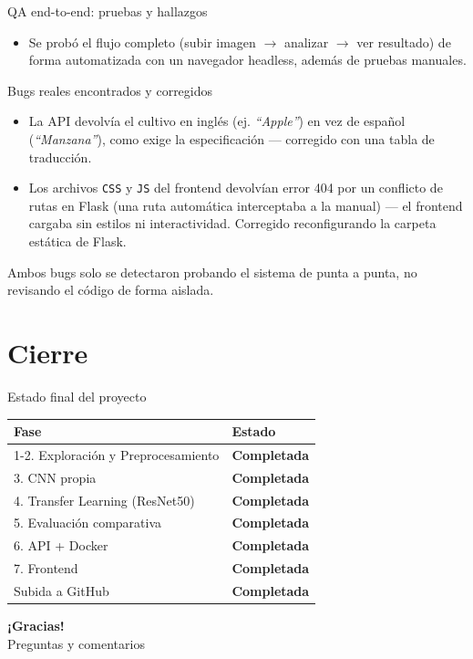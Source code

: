 \documentclass[aspectratio=169]{beamer}
\begin{document}
\begin{frame}{QA end-to-end: pruebas y hallazgos}
  \begin{itemize}
    \item Se probó el flujo completo (subir imagen $\to$ analizar $\to$ ver resultado) de forma automatizada con un navegador headless, además de pruebas manuales.
  \end{itemize}
  \begin{alertblock}{Bugs reales encontrados y corregidos}
    \begin{itemize}
      \item La API devolvía el cultivo en inglés (ej. \textit{``Apple''}) en vez de español (\textit{``Manzana''}), como exige la especificación — corregido con una tabla de traducción.
      \item Los archivos \texttt{CSS} y \texttt{JS} del frontend devolvían error 404 por un conflicto de rutas en Flask (una ruta automática interceptaba a la manual) — el frontend cargaba sin estilos ni interactividad. Corregido reconfigurando la carpeta estática de Flask.
    \end{itemize}
  \end{alertblock}
  \footnotesize Ambos bugs solo se detectaron probando el sistema de punta a punta, no revisando el código de forma aislada.
\end{frame}

\section{Cierre}

\begin{frame}{Estado final del proyecto}
  \centering
  \begin{tabular}{p{6cm}p{3.5cm}}
    \toprule
    \textbf{Fase} & \textbf{Estado} \\
    \midrule
    1-2. Exploración y Preprocesamiento & \textcolor{okgreen}{\textbf{Completada}} \\
    3. CNN propia & \textcolor{okgreen}{\textbf{Completada}} \\
    4. Transfer Learning (ResNet50) & \textcolor{okgreen}{\textbf{Completada}} \\
    5. Evaluación comparativa & \textcolor{okgreen}{\textbf{Completada}} \\
    6. API + Docker & \textcolor{okgreen}{\textbf{Completada}} \\
    7. Frontend & \textcolor{okgreen}{\textbf{Completada}} \\
    Subida a GitHub & \textcolor{okgreen}{\textbf{Completada}} \\
    \bottomrule
  \end{tabular}
\end{frame}

\begin{frame}
  \centering
  \Large \textbf{¡Gracias!}\\[0.5cm]
  \normalsize Preguntas y comentarios
\end{frame}
\end{document}
